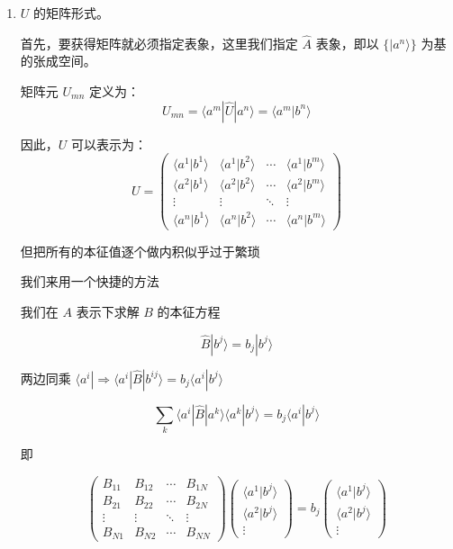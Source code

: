 \documentclass[lang=cn,10pt]{elegantbook}
\begin{document}
\begin{enumerate}
	\item $U$ 的矩阵形式。
	
	首先，要获得矩阵就必须指定表象，这里我们指定 $\hat{A}$ 表象，即以 $\{ |a^n\rangle \}$ 为基的张成空间。
	
	矩阵元 $U_{mn}$ 定义为：
	\[
	U_{mn} = \langle a^m | \hat{U} | a^n \rangle = \langle a^m | b^n \rangle
	\]
	
	因此，$U$ 可以表示为：
	\[
	U = \begin{pmatrix}
		\langle a^1 | b^1 \rangle & \langle a^1 | b^2 \rangle & \cdots & \langle a^1 | b^m \rangle \\
		\langle a^2 | b^1 \rangle & \langle a^2 | b^2 \rangle & \cdots & \langle a^2 | b^m \rangle \\
		\vdots & \vdots & \ddots & \vdots \\
		\langle a^n | b^1 \rangle & \langle a^n | b^2 \rangle & \cdots & \langle a^n | b^m \rangle
	\end{pmatrix}
	\]
	
	但把所有的本征值逐个做内积似乎过于繁琐
	
	我们来用一个快捷的方法
	
	我们在 $A$ 表示下求解 $B$ 的本征方程
	
	\[
	\hat{B} | b^{j} \rangle = b_j | b^{j} \rangle
	\]
	
	两边同乘 $\langle a^{i} | \Rightarrow \langle a^{i} | \hat{B} | b^{ij} \rangle = b_j \langle a^{i} | b^{j} \rangle$
	
	\[
	\sum_k \langle a^{i} | \hat{B} | a^{k} \rangle \langle a^{k} | b^{j} \rangle = b_j \langle a^{i} | b^{j} \rangle
	\]
	
	即
	
	\[
	\begin{pmatrix}
		B_{11} & B_{12} & \cdots & B_{1N} \\
		B_{21} & B_{22} & \cdots & B_{2N} \\
		\vdots & \vdots & \ddots & \vdots \\
		B_{N1} & B_{N2} & \cdots & B_{NN}
	\end{pmatrix}
	\begin{pmatrix}
		\langle a^{1} | b^{j} \rangle \\
		\langle a^{2} | b^{j} \rangle \\
		\vdots
	\end{pmatrix}
	=
	b_j
	\begin{pmatrix}
		\langle a^{1} | b^{j} \rangle \\
		\langle a^{2} | b^{j} \rangle \\
		\vdots
	\end{pmatrix}
	\]
	

\end{enumerate}
\end{document}
